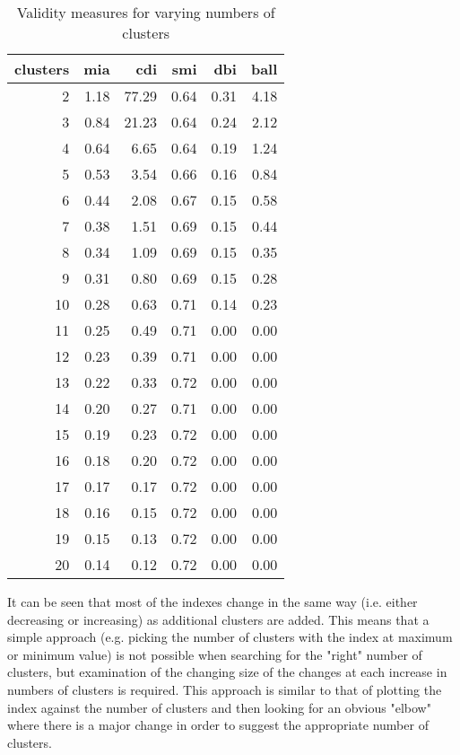 \documentclass[conference]{IEEEtran}
\begin{document}
\begin{table}[ht]
\begin{center}
\caption{Validity measures for varying numbers of clusters}
\label{table-measures}
\begin{tabular}{rrrrrr}
  \hline
 clusters & mia & cdi & smi & dbi & ball \\ 
  \hline
2 & 1.18 & 77.29 & 0.64 & 0.31 & 4.18 \\ 
3 & 0.84 & 21.23 & 0.64 & 0.24 & 2.12 \\ 
4 & 0.64 & 6.65 & 0.64 & 0.19 & 1.24 \\ 
5 & 0.53 & 3.54 & 0.66 & 0.16 & 0.84 \\ 
6 & 0.44 & 2.08 & 0.67 & 0.15 & 0.58 \\ 
7 & 0.38 & 1.51 & 0.69 & 0.15 & 0.44 \\ 
8 & 0.34 & 1.09 & 0.69 & 0.15 & 0.35 \\ 
9 & 0.31 & 0.80 & 0.69 & 0.15 & 0.28 \\ 
10 & 0.28 & 0.63 & 0.71 & 0.14 & 0.23 \\ 
11 & 0.25 & 0.49 & 0.71 & 0.00 & 0.00 \\ 
12 & 0.23 & 0.39 & 0.71 & 0.00 & 0.00 \\ 
13 & 0.22 & 0.33 & 0.72 & 0.00 & 0.00 \\ 
14 & 0.20 & 0.27 & 0.71 & 0.00 & 0.00 \\ 
15 & 0.19 & 0.23 & 0.72 & 0.00 & 0.00 \\ 
16 & 0.18 & 0.20 & 0.72 & 0.00 & 0.00 \\ 
17 & 0.17 & 0.17 & 0.72 & 0.00 & 0.00 \\ 
18 & 0.16 & 0.15 & 0.72 & 0.00 & 0.00 \\ 
19 & 0.15 & 0.13 & 0.72 & 0.00 & 0.00 \\ 
20 & 0.14 & 0.12 & 0.72 & 0.00 & 0.00 \\ 
   \hline
\end{tabular}
\end{center}
\end{table}

It can be seen that most of the indexes change in the same way (i.e. either decreasing or increasing) as additional clusters are added. This means that a simple approach (e.g. picking the number of clusters with the index at maximum or minimum value) is not possible when searching for the "right" number of clusters, but examination of the changing size of the changes at each increase in numbers of clusters is required. This approach is similar to that of plotting the index against the number of clusters and then looking for an obvious "elbow" where there is a major change in order to suggest the appropriate number of clusters.
\end{document}
